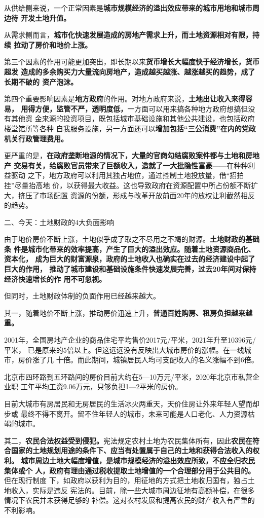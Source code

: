 从供给侧来说，一个正常因素是\textbf{城市规模经济的溢出效应带来的城市用地和城市周边待
开发土地升值。}

从需求侧而言，\textbf{城市化快速发展造成的房地产需求上升，而土地资源相对有限，持续
  拉动了房价和地价上涨。}

第三个因素的作用可能更加突出，即长期以来\textbf{货币增长大幅度快于经济增长，货币超发
造成的多余购买力大量流向房地产，造成越买越涨、越涨越买的趋势，成了长期不破的
资产泡沫。}

第四个重要影响因素是\textbf{地方政府}的作用。对地方政府来说，\textbf{土地出让收入来得容易，
  用得方便，监管不严，透明度低，}一方面可以用来搞各种地方政府想搞但没有其他资
金来源的投资项目，既包括城市基础设施和其他公共建设，也包括政府楼堂馆所等各种
自我服务设施，另一方面还可以\textbf{增加包括“三公消费”在内的党政机关行政管理费用。}

更严重的是，\textbf{在政府垄断地源的情况下，大量的官商勾结腐败案件都与土地和房地产
  交易有关，给腐败官员带来了巨额收入，造就了一大批隐性富豪}——在种种利益驱动
之下，地方政府可以利用其独占地位，通过控制土地投放量，借“招拍挂”尽量抬高地
价，以获得最大收益。这也导致政府在资源配置中所占份额不断扩大，挤压了市场配置
资源的份额，形成与改革开放前面20年的放权让利截然相反的趋势。

{\heiti 二、今天：土地财政的4大负面影响}

由于地价房价不断上涨，土地似乎成了取之不尽用之不竭的财源。\textbf{土地财政的基础条
  件是城市化带来的效率提高，产生了巨大的溢出效应。随着土地资源商品化、资本化，
  成为巨大的财富源泉，政府的土地收入也确实在过去的经济建设中起了巨大的作用，
  推动了城市建设和基础设施条件快速发展完善，过去20年间对保持经济快速增长的作
  用不可忽视。}

但同时，土地财政体制的负面作用已经越来越大。

其一，随着地价不断上涨，推动房价迅速上升，\textbf{普通百姓购房、租房负担越来越重。}

2001年，全国房地产企业的商品住宅平均售价2017元/平米，2021年升至10396元/平米，
已是原来的5倍以上。但这远远没有反映出大城市房价的涨幅。在一线城市，房价涨了几
十倍。而此期间，城镇居民人均可支配收入的名义涨幅不到6倍。

北京市四环路到五环路间的房价目前大约在5—10万元/平米，2020年北京市私营企业职
工年平均工资9.06万元，只够负担1—2平米的房价。

目前大城市有房居民和无房居民的生活冰火两重天，天价住房让外来年轻人望而却步或
最终不得不离开。留不住年轻人的城市，未来可能是人口老化、人力资源枯竭的城市。

其二，\textbf{农民合法权益受到侵犯。}宪法规定农村土地为农民集体所有，因此\textbf{农民在符
  合国家的土地规划用途的条件下、应当有处置属于自己的土地和获得合法收入的权利。
  城市周边土地大幅度增值，是城市规模经济的溢出效应所致，不应全归农民集体或个
  人，政府有理由通过税收提取土地增值的一个合理部分用于公共目的。}但在现行制度
下，如政府以获利为目的，用征地的方式把土地收归国有，独占土地收入，实际是违反
宪法的。目前，除一些大城市周边征地有高额补偿，在很多情况下农民并未获得足够的
补偿。这对农村发展和提高农民的财产收入有严重的不利影响。

